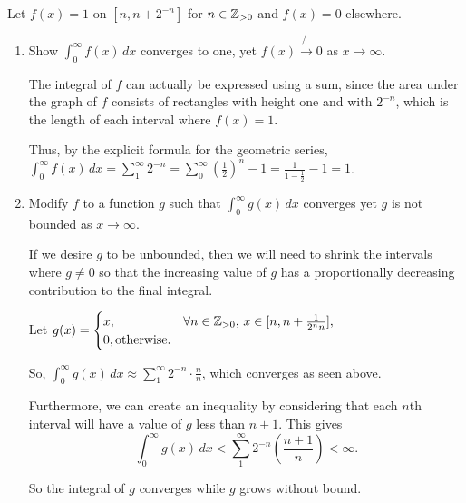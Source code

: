 \documentclass[../hw1]{subfiles}
\begin{document}
\begin{problem}[5]
Let $f(x)=1$ on $[n,n+2^{-n}]$ for $n \in \mathbb{Z}_{>0}$ and $f(x)=0$ elsewhere.
\begin{enumerate}[label=\alph*)]
	\item Show $\int_{0}^{\infty} f(x) \,dx$ converges to one, yet $f(x)\not{\to}0$ as $x\to \infty$.

	      The integral of $f$ can actually be expressed using a sum, since the area under the graph of $f$ consists of rectangles with height one and with  $2^{-n}$, which is the length of each interval where $f(x)=1$.

	      Thus, by the explicit formula for the geometric series,
	      $\int_{0}^{\infty} f(x) \,dx = \sum_{1}^{\infty} 2^{-n} = \sum_{0}^{\infty} {(\frac{1}{2})}^n - 1 = \frac{1}{1-\frac{1}{2}} - 1 = 1$.

	\item Modify $f$ to a function  $g$ such that  $\int_{0}^{\infty} g(x) \,dx$ converges yet $g$ is not bounded as  $x\to \infty$.

	      If we desire $g$ to be unbounded, then we will need to shrink the intervals where  $g\neq 0$ so that the increasing value of $g$ has a proportionally decreasing contribution to the final integral.

	      Let  $g(x)=\begin{cases}
			      x, & \forall n \in \mathbb{Z}_{>0},\, x \in [n,n+\frac{1}{2^n n}], \\
			      0, \text{otherwise}.
		      \end{cases}$

	      So, $\int_{0}^{\infty} g(x) \,dx \approx \sum_{1}^{\infty} 2^{-n}\cdot \frac{n}{n}$, which converges as seen above.

	      Furthermore, we can create an inequality by considering that each $n$th interval will have a value of  $g$ less than  $n+1$.
	      This gives  \[
		      \int_{0}^{\infty} g(x) \,dx < \sum_{1}^{\infty} 2^{-n}\left( \frac{n+1}{n} \right) < \infty
		      .\]

	      So the integral of $g$ converges while $g$ grows without bound.
\end{enumerate}
\end{problem}
\end{document}
